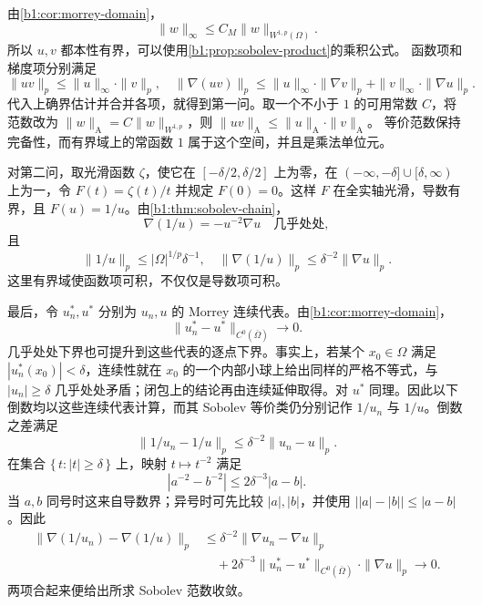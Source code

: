 \begin{solution}
由\cref{b1:cor:morrey-domain}，
\[
 \|w\|_\infty\le C_M\|w\|_{W^{1,p}(\Omega)}.
\]
所以 \(u,v\) 都本性有界，可以使用\cref{b1:prop:sobolev-product}的乘积公式。
函数项和梯度项分别满足
\[
 \|uv\|_p\le\|u\|_\infty\cdot\|v\|_p,
 \quad
 \|\nabla(uv)\|_p
 \le\|u\|_\infty\cdot\|\nabla v\|_p
       +\|v\|_\infty\cdot\|\nabla u\|_p.
\]
代入上确界估计并合并各项，就得到第一问。取一个不小于 \(1\) 的可用常数 \(C\)，将范数改为
\(\|w\|_{\mathrm A}=C\|w\|_{W^{1,p}}\)，则
\(\|uv\|_{\mathrm A}\le\|u\|_{\mathrm A}\cdot\|v\|_{\mathrm A}\)。
等价范数保持完备性，而有界域上的常函数 \(1\) 属于这个空间，并且是乘法单位元。

对第二问，取光滑函数 \(\zeta\)，使它在 \([-\delta/2,\delta/2]\) 上为零，在
\((-\infty,-\delta]\cup[\delta,\infty)\) 上为一，令
\(F(t)=\zeta(t)/t\) 并规定 \(F(0)=0\)。这样 \(F\) 在全实轴光滑，导数有界，且
\(F(u)=1/u\)。由\cref{b1:thm:sobolev-chain}，
\[
 \nabla(1/u)=-u^{-2}\nabla u
       \quad\text{几乎处处},
\]
且
\[
 \|1/u\|_p\le|\Omega|^{1/p}\delta^{-1},
 \quad
 \|\nabla(1/u)\|_p\le\delta^{-2}\|\nabla u\|_p.
\]
这里有界域使函数项可积，不仅仅是导数项可积。

最后，令 \(u_n^*,u^*\) 分别为 \(u_n,u\) 的 Morrey 连续代表。由\cref{b1:cor:morrey-domain}，
\[
 \|u_n^*-u^*\|_{C^0(\overline\Omega)}\longrightarrow0.
\]
几乎处处下界也可提升到这些代表的逐点下界。事实上，若某个 \(x_0\in\Omega\) 满足 \(|u_n^*(x_0)|<\delta\)，连续性就在 \(x_0\) 的一个内部小球上给出同样的严格不等式，与 \(|u_n|\ge\delta\) 几乎处处矛盾；闭包上的结论再由连续延伸取得。对 \(u^*\) 同理。因此以下倒数均以这些连续代表计算，而其 Sobolev 等价类仍分别记作 \(1/u_n\) 与 \(1/u\)。倒数之差满足
\[
 \|1/u_n-1/u\|_p\le\delta^{-2}\|u_n-u\|_p.
\]
在集合 \(\{\,t:|t|\ge\delta\,\}\) 上，映射 \(t\mapsto t^{-2}\) 满足
\[
 |a^{-2}-b^{-2}|\le2\delta^{-3}|a-b|.
\]
当 \(a,b\) 同号时这来自导数界；异号时可先比较 \(|a|,|b|\)，并使用
\(\bigl||a|-|b|\bigr|\le|a-b|\)。因此
\[
 \begin{aligned}
 \|\nabla(1/u_n)-\nabla(1/u)\|_p
 &\le\delta^{-2}\|\nabla u_n-\nabla u\|_p\\
 &\quad+2\delta^{-3}\|u_n^*-u^*\|_{C^0(\overline\Omega)}
                         \cdot\|\nabla u\|_p
 \longrightarrow0.
 \end{aligned}
\]
两项合起来便给出所求 Sobolev 范数收敛。
\end{solution}

